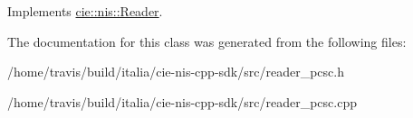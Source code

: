 Implements \hyperlink{classcie_1_1nis_1_1Reader_adaa0e8d0e2b367c0af8053fde8ae0af8}{cie\-::nis\-::\-Reader}.



The documentation for this class was generated from the following files\-:\begin{DoxyCompactItemize}
\item 
/home/travis/build/italia/cie-\/nis-\/cpp-\/sdk/src/reader\-\_\-pcsc.\-h\item 
/home/travis/build/italia/cie-\/nis-\/cpp-\/sdk/src/reader\-\_\-pcsc.\-cpp\end{DoxyCompactItemize}
